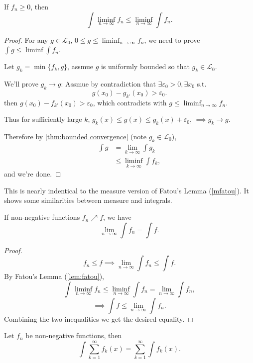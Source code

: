 \begin{lemma}
	\label{lem:fatou}
	If $f_n\ge 0$, then
	\[
		\int \liminf_{n\to \infty}f_n\le \liminf_{n\to \infty}\int f_n
	.\]
\end{lemma}
\begin{proof}[Proof]
	For any $g\in \mathcal{L}_0$,
	$0\le g\le \liminf_{n\to \infty} f_n$,
	we need to prove $\int g\le \liminf \int f_n$. 

	Let $g_k=\min\{f_k, g\}$, assmue $g$ is uniformly bounded
	so that $g_k\in \mathcal{L}_0$.
	
    We'll prove $g_k\to g$:
	Assmue by contradiction that $\exists\varepsilon_0>0, \exists x_0$ s.t.
	\[
		g(x_0) - g_{k'}(x_0) > \varepsilon_0
	.\]
	then $g(x_0) - f_{k'}(x_0) > \varepsilon_0$,
	which contradicts with $g\le \liminf_{n\to \infty} f_n$.
	
	Thus for sufficiently large $k$,
	$g_k(x)\le g(x)\le g_k(x) + \varepsilon_0$, $\implies g_k\to g$.
	
	Therefore by \autoref{thm:bounded convergence} (note $g_k\in \mathcal{L}_0$),
	\begin{align*}
		\int g &= \lim_{k \to \infty}\int g_k \\
		&\le \liminf_{k \to \infty} \int f_k,
	\end{align*}
	and we're done.
\end{proof}
\begin{remark}
	This is nearly indentical to the measure version of
	Fatou's Lemma (\autoref{mfatou}).
	It shows some similarities between measure and integrals.
\end{remark}

\begin{theorem}
	\label{thm:beppo-levi}
    If non-negative functions $f_n \nearrow f$, we have
	 \[
	\lim_{n\to \infty}\int f_n = \int f
	.\]
\end{theorem}
\begin{proof}[Proof]
    \[
    f_n\le f\implies \lim_{n \to \infty}\int f_n \le \int f
    .\]
    By Fatou's Lemma (\ref{lem:fatou}),
	\[
	\int \liminf_{n\to \infty} f_n \le \liminf_{n\to \infty}\int f_n
	= \lim_{n \to \infty}\int f_n,
	\]
	\[
		\implies \int f \le \lim_{n\to \infty} \int f_n.
	\]
	Combining the two inequalities we get the desired equality.
\end{proof}
\begin{corollary}
    Let $f_n$ be non-negative functions, then
	\[
	\int \sum_{k=1}^{\infty} f_k(x) = \sum_{k=1}^{\infty} \int f_k(x)
	.\]
\end{corollary}

